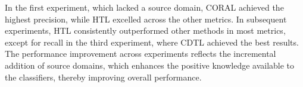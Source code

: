 In the first experiment, which lacked a source domain, CORAL achieved the highest precision, while HTL excelled across the other metrics. In subsequent experiments, HTL consistently outperformed other methods in most metrics, except for recall in the third experiment, where CDTL achieved the best results. The performance improvement across experiments reflects the incremental addition of source domains, which enhances the positive knowledge available to the classifiers, thereby improving overall performance.
  
\begin{table}[H]
  \centering
  \caption{Comprehensive performance comparison of CORAL, CDTL, and HTL across all previous experiments.}
\end{table}
